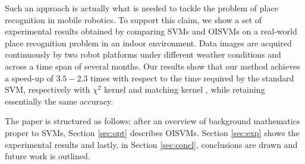 Such an approach is actually what is needed to tackle the problem of
place recognition in mobile robotics. To support this claim, we show a
set of experimental results obtained by comparing SVMs and OISVMs on a
real-world place recognition problem in an indoor environment. Data
images are acquired continuously by two robot platforms under
different weather conditions and across a time span of several
months. Our results show that our method achieves a speed-up of
$3.5-2.3$ times with respect to the time required by the standard SVM,
respectively with $\chi^2$ kernel and matching kernel
\cite{wallraven:iccv03}, while retaining essentially the same
accuracy.

The paper is structured as follows: after an overview  of background
mathematics proper to SVMs,  Section \ref{sec:opt} describes OISVMs.
Section \ref{sec:exp} shows the experimental results and
lastly, in Section \ref{sec:concl}, conclusions are drawn and future
work is outlined.
